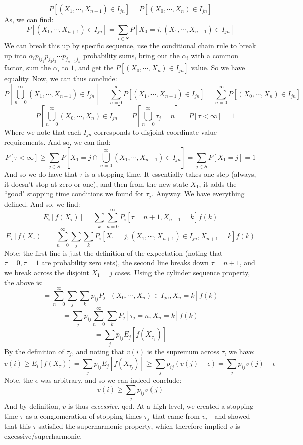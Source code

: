 \documentclass[12pt,a4paper]{article}
\newcommand{\1}[1]{\mathbbm{1}\left\{ #1 \right\}}
\begin{document}
$$
	P\left[(X_1, \cdots, X_{n+1}) \in I_{jn}\right] =
	P\left[(X_0, \cdots, X_n) \in I_{jn}\right]
$$
As, we can find:
$$
	P\left[(X_1, \cdots, X_{n+1}) \in I_{jn}\right] = 
	\sum_{i \in S} P\left[X_0 = i, (X_1, \cdots, X_{n+1}) \in I_{jn}\right]
$$
We can break this up by specific sequence, use the conditional chain rule to break up into $\alpha_i p_{ij_1} p_{j_2j_3} \cdots p_{j_{n-1}j_n}$ probability sums, bring out the $\alpha_i$ with a common factor, sum the $\alpha_i$ to $1$, and get the $P\left[(X_0, \cdots, X_n) \in I_{jn}\right]$ value. So we have equality. Now, we can thus conclude:
$$
	P\left[\bigcup_{n=0}^\infty (X_1, \cdots, X_{n+1}) \in I_{jn}\right] =
	\sum_{n=0}^\infty P\left[(X_1, \cdots, X_{n+1}) \in I_{jn}\right] =
	\sum_{n=0}^\infty P\left[(X_0, \cdots, X_n) \in I_{jn}\right]
$$
$$
	= P\left[\bigcup_{n=0}^\infty (X_0, \cdots, X_n) \in I_{jn}\right] = P\left[\bigcup_{n=0}^\infty \tau_j = n\right] =
	P\left[\tau < \infty\right] = 1
$$
Where we note that each $I_{jn}$ corresponds to disjoint coordinate value requirements. And so, we can find:
$$
	P\left[\tau < \infty\right] \geq
	\sum_{j \in S} P\left[X_1 = j \cap \bigcup_{n=0}^\infty (X_1, \cdots, X_{n+1}) \in I_{jn}\right] =
	\sum_{j \in S} P\left[X_1 = j\right] = 1
$$
And so we do have that $\tau$ is a stopping time. It essentially takes one step (always, it doesn't stop at zero or one), and then from the new state $X_1$, it adds the ``good" stopping time conditions we found for $\tau_j$. Anyway. We have everything defined. And so, we find:
$$
	E_i\left[f(X_\tau)\right] =
	\sum_k \sum_{n=0}^\infty P_i\left[\tau = n + 1, X_{n + 1} = k\right]f(k)
$$
$$
	E_i\left[f(X_\tau)\right] =
	\sum_{n=0}^\infty \sum_j \sum_k P_i\left[X_1 = j, (X_1, \cdots, X_{n+1}) \in I_{jn}, X_{n + 1} = k\right]f(k)
$$
Note: the first line is just the definition of the expectation (noting that $\tau = 0, \tau = 1$ are probability zero sets), the second line breaks down $\tau = n + 1$, and we break across the disjoint $X_1 = j$ cases. Using the cylinder sequence property, the above is:
$$
	= \sum_{n=0}^\infty \sum_j \sum_k p_{ij}P_j\left[(X_0, \cdots, X_n) \in I_{jn}, X_n = k\right]f(k)
$$
$$
	= \sum_j p_{ij} \sum_{n=0}^\infty\sum_k P_j\left[\tau_j = n, X_n = k\right]f(k)
$$
$$
	= \sum_j p_{ij} E_j\left[f(X_{\tau_j})\right]
$$
By the definition of $\tau_j$, and noting that $v(i)$ is the supremum across $\tau$, we have:
$$
	v(i) \geq E_i\left[f(X_\tau)\right] = \sum_j p_{ij} E_j\left[f(X_{\tau_j})\right] \geq
	\sum_j p_{ij}(v(j) - \epsilon) =
	\sum_j p_{ij}v(j) - \epsilon
$$
Note, the $\epsilon$ was arbitrary, and so we can indeed conclude:
$$
	v(i) \geq \sum_j p_{ij}v(j)
$$
And by definition, $v$ is thus \textit{excessive}. qed. At a high level, we created a stopping time $\tau$ as a conglomeration of stopping times $\tau_j$ that came from $v_i$ - and showed that this $\tau$ satisfied the superharmonic property, which therefore implied $v$ is excessive/superharmonic.
\end{document}
